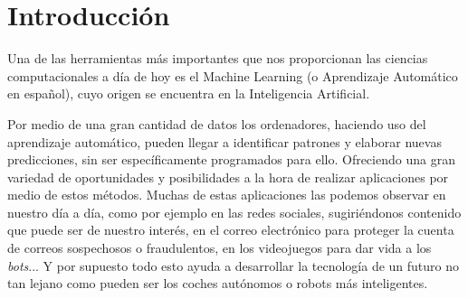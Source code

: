 \documentclass[a4paper, 12pt]{book}
\begin{document}


\tableofcontents 
\cleardoublepage
\listoffigures %
\cleardoublepage
\listoflistings


\cleardoublepage
\chapter{Introducción}
\label{sec:intro}

Una de las herramientas más importantes que nos proporcionan las ciencias computacionales a día de hoy es el Machine Learning (o Aprendizaje Automático en español), cuyo origen se encuentra en la Inteligencia Artificial. 

Por medio de una gran cantidad de datos los ordenadores, haciendo uso del aprendizaje automático, pueden llegar a identificar patrones y elaborar nuevas predicciones, sin ser específicamente programados para ello. Ofreciendo una gran variedad de oportunidades y posibilidades a la hora de realizar aplicaciones por medio de estos métodos. Muchas de estas aplicaciones las podemos observar en nuestro día a día, como por ejemplo en las redes sociales, sugiriéndonos contenido que puede ser de nuestro interés, en el correo electrónico para proteger la cuenta de correos sospechosos o fraudulentos, en los videojuegos para dar vida a los \textit{bots}... Y por supuesto todo esto ayuda a desarrollar la tecnología de un futuro no tan lejano como pueden ser los coches autónomos o robots más inteligentes.
\end{document}
